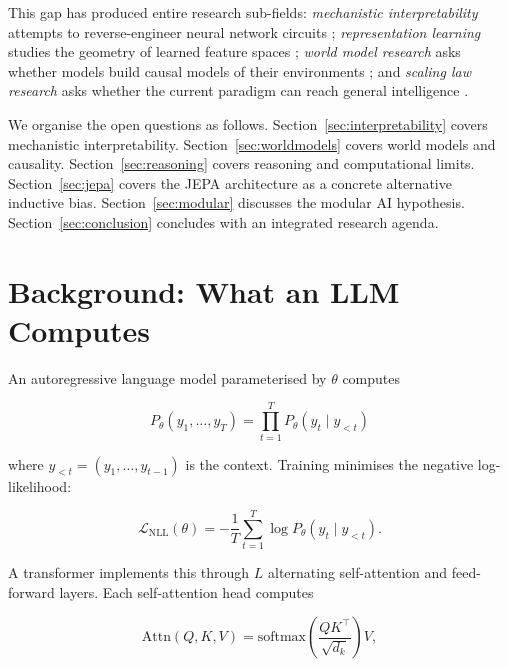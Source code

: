 \documentclass[10pt,twocolumn]{article}
\begin{document}
This gap has produced entire research sub-fields: \emph{mechanistic
interpretability} attempts to reverse-engineer neural network circuits
\citep{olah2020zoom}; \emph{representation learning} studies the geometry of
learned feature spaces \citep{elhage2022superposition}; \emph{world model
research} asks whether models build causal models of their environments
\citep{lecun2022path}; and \emph{scaling law research} asks whether the
current paradigm can reach general intelligence \citep{hoffmann2022chinchilla}.

We organise the open questions as follows.  Section~\ref{sec:interpretability}
covers mechanistic interpretability.  Section~\ref{sec:worldmodels} covers
world models and causality.  Section~\ref{sec:reasoning} covers reasoning
and computational limits.  Section~\ref{sec:jepa} covers the JEPA
architecture as a concrete alternative inductive bias.
Section~\ref{sec:modular} discusses the modular AI hypothesis.
Section~\ref{sec:conclusion} concludes with an integrated research agenda.

\section{Background: What an LLM Computes}
\label{sec:background}

An autoregressive language model parameterised by $\theta$ computes

\begin{equation}
  P_\theta(y_1, \ldots, y_T) = \prod_{t=1}^{T} P_\theta(y_t \mid y_{<t})
  \label{eq:lm}
\end{equation}

\noindent where $y_{<t} = (y_1, \ldots, y_{t-1})$ is the context.  Training
minimises the negative log-likelihood:

\begin{equation}
  \mathcal{L}_{\text{NLL}}(\theta) = -\frac{1}{T}\sum_{t=1}^{T} \log P_\theta(y_t \mid y_{<t}).
  \label{eq:nll}
\end{equation}

A transformer \citep{vaswani2017attention} implements this through $L$
alternating self-attention and feed-forward layers.  Each self-attention
head computes

\begin{equation}
  \text{Attn}(Q,K,V) = \text{softmax}\!\left(\frac{QK^\top}{\sqrt{d_k}}\right)V,
  \label{eq:attention}
\end{equation}
\end{document}
